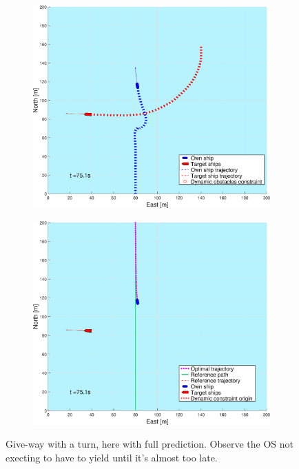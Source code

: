 \begin{figure}[ht!]
\begin{subfigure}[b]{0.494\textwidth}
        \subcaption{}
    \end{subfigure}
    \hfill
    \\
    \begin{subfigure}[b]{0.494\textwidth}
        \centering
        \includegraphics[width=\textwidth]{Images/Figures/sving_GW/_Simple_0fig1_time=75}
        \subcaption{}
    \end{subfigure}
    \hfill
    \begin{subfigure}[b]{0.494\textwidth}
        \centering
        \includegraphics[width=\textwidth]{Images/Figures/sving_GW/_Simple_0fig999_time=75}
        \subcaption{}
    \end{subfigure}
    \hfill
    \caption{Give-way with a turn, here with full prediction. Observe the \gls{OS} not execting to have to yield until it's almost too late.}
    \label{FIG: turn GW full pred}
\end{figure}%
